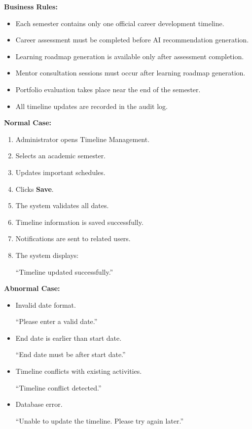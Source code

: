 \vspace{0.2cm}

\textbf{Business Rules:}

\begin{itemize}
    \item Each semester contains only one official career development timeline.
    \item Career assessment must be completed before AI recommendation generation.
    \item Learning roadmap generation is available only after assessment completion.
    \item Mentor consultation sessions must occur after learning roadmap generation.
    \item Portfolio evaluation takes place near the end of the semester.
    \item All timeline updates are recorded in the audit log.
\end{itemize}

\vspace{0.2cm}

\textbf{Normal Case:}

\begin{enumerate}
    \item Administrator opens Timeline Management.
    \item Selects an academic semester.
    \item Updates important schedules.
    \item Clicks \textbf{Save}.
    \item The system validates all dates.
    \item Timeline information is saved successfully.
    \item Notifications are sent to related users.
    \item The system displays:

    ``Timeline updated successfully.''
\end{enumerate}

\vspace{0.2cm}

\textbf{Abnormal Case:}

\begin{itemize}
    \item Invalid date format.

    ``Please enter a valid date.''

    \item End date is earlier than start date.

    ``End date must be after start date.''

    \item Timeline conflicts with existing activities.

    ``Timeline conflict detected.''

    \item Database error.

    ``Unable to update the timeline. Please try again later.''
\end{itemize}

